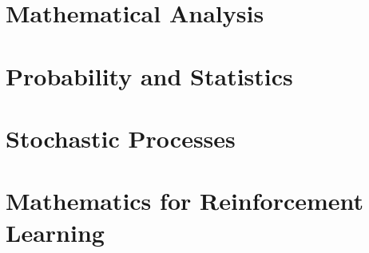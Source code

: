 \documentclass[11pt,a4paper]{article}
\begin{document}
\part{Mathematical Analysis}







\part{Probability and Statistics}







\part{Stochastic Processes}








\part{Mathematics for Reinforcement Learning}






\end{document}
